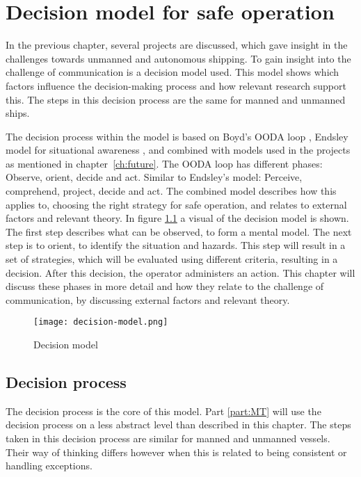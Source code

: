 \chapter{Decision model for safe operation}
\label{ch:model}
In the previous chapter, several projects are discussed, which gave insight in the challenges towards unmanned and autonomous shipping. To gain insight into the challenge of communication is a decision model used. This model shows which factors influence the decision-making process and how relevant research support this. The steps in this decision process are the same for manned and unmanned ships.

The decision process within the model is based on Boyd's OODA loop \cite{Boyd1987}, Endsley model for situational awareness \cite{Endsley2013}, and combined with models used in the projects as mentioned in chapter~\ref{ch:future}. 
The OODA loop has different phases: Observe, orient, decide and act. Similar to Endsley's model: Perceive, comprehend, project, decide and act. 
The combined model describes how this applies to, choosing the right strategy for safe operation, and relates to external factors and relevant theory. In figure \ref{fig:decision-model} a visual of the decision model is shown. The first step describes what can be observed, to form a mental model. The next step is to orient, to identify the situation and hazards. This step will result in a set of strategies, which will be evaluated using different criteria, resulting in a decision. After this decision, the operator administers an action. This chapter will discuss these phases in more detail and how they relate to the challenge of communication, by discussing external factors and relevant theory.

\begin{figure}[p]
	\centering
	\texttt{[image: decision-model.png]}
	\caption{Decision model}
	\label{fig:decision-model}
\end{figure}

\section{Decision process}
The decision process is the core of this model. Part \ref{part:MT} will use the decision process on a less abstract level than described in this chapter. The steps taken in this decision process are similar for manned and unmanned vessels. Their way of thinking differs however when this is related to being consistent or handling exceptions.

